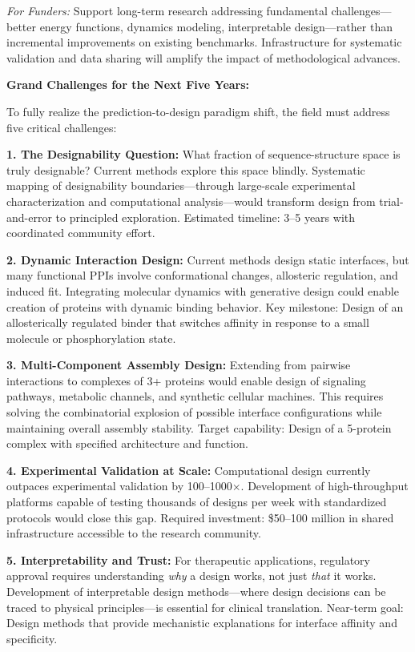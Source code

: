\noindent
\textit{For Funders:} Support long-term research addressing fundamental challenges---better energy functions, dynamics modeling, interpretable design---rather than incremental improvements on existing benchmarks. Infrastructure for systematic validation and data sharing will amplify the impact of methodological advances.

\vspace{1em}
\noindent
\textbf{Grand Challenges for the Next Five Years:}

\noindent
To fully realize the prediction-to-design paradigm shift, the field must address five critical challenges:

\noindent
\textbf{1. The Designability Question:} What fraction of sequence-structure space is truly designable? Current methods explore this space blindly. Systematic mapping of designability boundaries---through large-scale experimental characterization and computational analysis---would transform design from trial-and-error to principled exploration. Estimated timeline: 3--5 years with coordinated community effort.

\noindent
\textbf{2. Dynamic Interaction Design:} Current methods design static interfaces, but many functional PPIs involve conformational changes, allosteric regulation, and induced fit. Integrating molecular dynamics with generative design could enable creation of proteins with dynamic binding behavior. Key milestone: Design of an allosterically regulated binder that switches affinity in response to a small molecule or phosphorylation state.

\noindent
\textbf{3. Multi-Component Assembly Design:} Extending from pairwise interactions to complexes of 3+ proteins would enable design of signaling pathways, metabolic channels, and synthetic cellular machines. This requires solving the combinatorial explosion of possible interface configurations while maintaining overall assembly stability. Target capability: Design of a 5-protein complex with specified architecture and function.

\noindent
\textbf{4. Experimental Validation at Scale:} Computational design currently outpaces experimental validation by 100--1000$\times$. Development of high-throughput platforms capable of testing thousands of designs per week with standardized protocols would close this gap. Required investment: \$50--100 million in shared infrastructure accessible to the research community.

\noindent
\textbf{5. Interpretability and Trust:} For therapeutic applications, regulatory approval requires understanding \textit{why} a design works, not just \textit{that} it works. Development of interpretable design methods---where design decisions can be traced to physical principles---is essential for clinical translation. Near-term goal: Design methods that provide mechanistic explanations for interface affinity and specificity.

